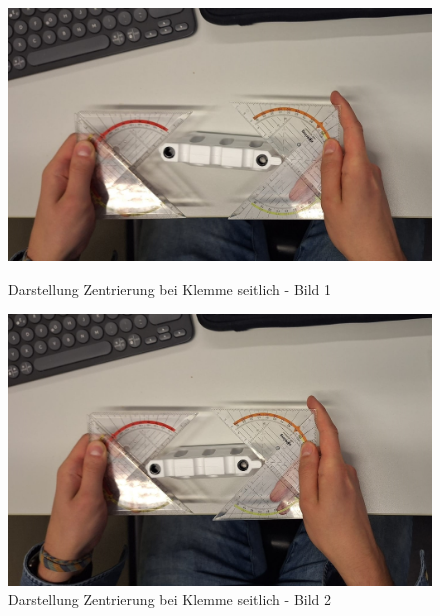 \documentclass[../main.tex]{subfiles}
\begin{document}
            \begin{figure}[h!]
                \centering
                \begin{minipage}{0.48\textwidth}
                    \centering
                    \includegraphics[width=\linewidth]{img/konzeptfindung/klemme_breitenweg_zentrierung_1.jpeg}
                    \caption{Darstellung Zentrierung bei Klemme seitlich - Bild 1}
                    \label{img:konzept_zentrierung_1}
                \end{minipage}
                \hfill
                \begin{minipage}{0.48\textwidth}
                    \centering
                    \includegraphics[width=\linewidth]{img/konzeptfindung/klemme_breitenweg_zentrierung_2.jpeg}
                    \caption{Darstellung Zentrierung bei Klemme seitlich - Bild 2}
                    \label{img:konzept_zentrierung_2}
                \end{minipage}
            \end{figure}
\end{document}
